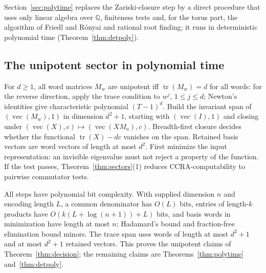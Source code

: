 \documentclass[acmlarge,screen,11pt,nonacm,natbib=false]{acmart}
\newcommand{\Q}{\mathbb{Q}}
\newcommand{\tr}{\operatorname{tr}}
\newcommand{\vecop}{\operatorname{vec}}
\theoremstyle{definition}
\begin{document}
Section~\ref{sec:polytime} replaces the Zariski-closure step by a direct procedure that uses only linear algebra over $\Q$, finiteness tests and, for the torus part, the algorithm of Friedl and R\'onyai and rational root finding; it runs in deterministic polynomial time (Theorem~\ref{thm:detpoly}).

\subsection{The unipotent sector in polynomial time}
For $d\ge1$, all word matrices $M_w$ are unipotent iff $\tr(M_w)=d$ for all words: for the reverse direction, apply the trace condition to $w^j$, $1\le j\le d$; Newton's identities give characteristic polynomial $(T-1)^d$. Build the invariant span of $(\vecop(M_w),1)$ in dimension $d^2+1$, starting with $(\vecop(I),1)$ and closing under $(\vecop(X),c)\mapsto(\vecop(XM_a),c)$. Breadth-first closure decides whether the functional $\tr(X)-dc$ vanishes on the span. Retained basis vectors are word vectors of length at most $d^2$. First minimize the input representation: an invisible eigenvalue must not reject a property of the function. If the test passes, Theorem~\ref{thm:sectors}(1) reduces CCRA-computability to pairwise commutator tests.

All steps have polynomial bit complexity. With supplied dimension $n$ and encoding length $L$, a common denominator has $O(L)$ bits, entries of length-$k$ products have $O(k(L+\log(n+1))+L)$ bits, and basis words in minimization have length at most $n$; Hadamard's bound and fraction-free elimination bound minors. The trace span uses words of length at most $d^2+1$ and at most $d^2+1$ retained vectors. This proves the unipotent claims of Theorem~\ref{thm:decision}; the remaining claims are Theorems~\ref{thm:polytime} and~\ref{thm:detpoly}.
\end{document}
